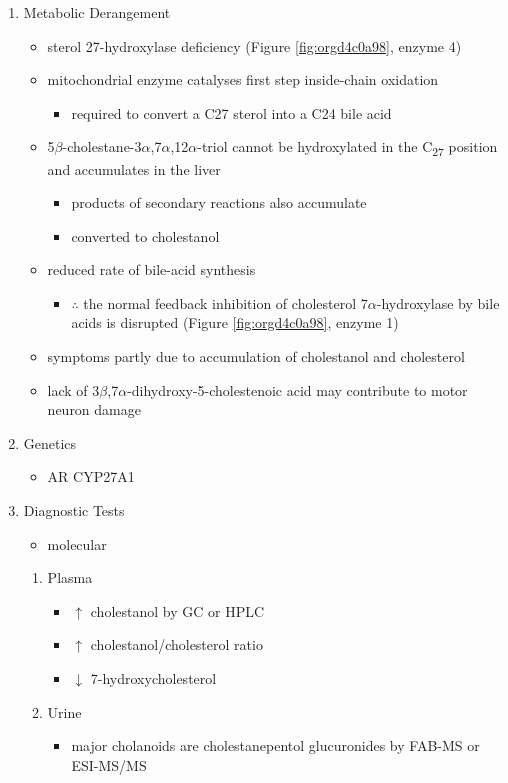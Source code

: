 \documentclass[12pt]{scrartcl}
\begin{document}
\begin{enumerate}
\item Metabolic Derangement
\label{sec:orga703053}
\begin{itemize}
\item sterol 27-hydroxylase deficiency (Figure \ref{fig:orgd4c0a98}, enzyme 4)
\item mitochondrial enzyme catalyses first step inside-chain oxidation
\begin{itemize}
\item required to convert a C27 sterol into a C24 bile acid
\end{itemize}
\item 5\(\beta\)-cholestane-3\(\alpha\),7\(\alpha\),12\(\alpha\)-triol cannot be hydroxylated in the C\textsubscript{27}
position and accumulates in the liver
\begin{itemize}
\item products of secondary reactions also accumulate
\item converted to cholestanol
\end{itemize}
\item reduced rate of bile-acid synthesis
\begin{itemize}
\item \(\therefore\) the normal feedback inhibition of cholesterol
7\(\alpha\)-hydroxylase by bile acids is disrupted (Figure \ref{fig:orgd4c0a98}, enzyme 1)
\end{itemize}
\item symptoms partly due to accumulation of cholestanol and cholesterol
\item lack of 3\(\beta\),7\(\alpha\)-dihydroxy-5-cholestenoic acid may contribute to motor
neuron damage
\end{itemize}

\item Genetics
\label{sec:org0925988}
\begin{itemize}
\item AR CYP27A1
\end{itemize}
\item Diagnostic Tests
\label{sec:orgfcf1b6c}
\begin{itemize}
\item molecular
\end{itemize}
\begin{enumerate}
\item Plasma
\label{sec:org380566b}
\begin{itemize}
\item \(\uparrow\) cholestanol by GC or HPLC
\item \(\uparrow\) cholestanol/cholesterol ratio
\item \(\downarrow\) 7-hydroxycholesterol
\end{itemize}
\item Urine
\label{sec:orga1adfe9}
\begin{itemize}
\item major cholanoids are cholestanepentol glucuronides by FAB-MS or ESI-MS/MS
\end{itemize}
\end{enumerate}


\end{enumerate}
\end{document}
